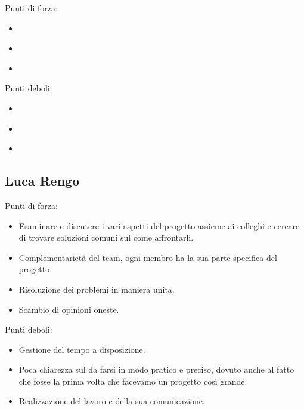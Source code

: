 \begin{flushleft}
	
	\textsf{\small Punti di forza:}\\
	
	\begin{itemize}
		\item \textsf{\small } %
		\item \textsf{\small }
		\item \textsf{\small }
	\end{itemize}
	
	\textsf{\small Punti deboli: }\\
	
	\begin{itemize}
		\item \textsf{\small } %
		\item \textsf{\small }
		\item \textsf{\small }
	\end{itemize}
	
\end{flushleft}


\subsection*{Luca Rengo}


\begin{flushleft}
	
	\textsf{\small Punti di forza:}\\
	
	\begin{itemize}
		\item \textsf{\small Esaminare e discutere i vari aspetti del progetto assieme ai colleghi e cercare di trovare soluzioni comuni sul come affrontarli. }
		\item \textsf{\small Complementarietà del team, ogni membro ha la sua parte specifica del progetto.}
		\item \textsf{\small Risoluzione dei problemi in maniera unita.}
		\item \textsf{\small Scambio di opinioni oneste.}
	\end{itemize}
	
	\textsf{\small Punti deboli: }\\
	
	\begin{itemize}
		\item \textsf{\small Gestione del tempo a disposizione.}
		\item \textsf{\small Poca chiarezza sul da farsi in modo pratico e preciso, dovuto anche al fatto che fosse la prima volta che facevamo un progetto così grande.}
		\item \textsf{\small Realizzazione del lavoro e della sua comunicazione.}
	\end{itemize}
	
\end{flushleft}

